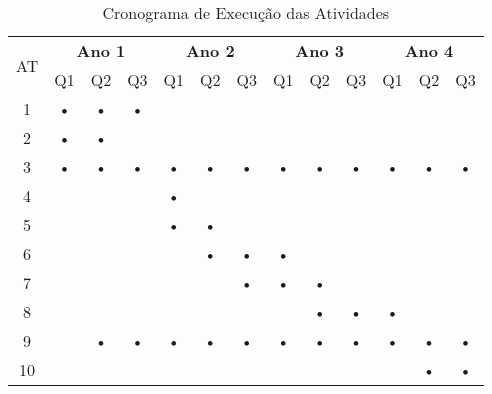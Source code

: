 \documentclass[12pt]{article}
\begin{document}
\begin{table}[htbp]
	\centering
		\begin{tabular}{|c|c|c|c|c|c|c|c|c|c|c|c|c|}
			\hline
			\multirow{2}{*}{AT} & \multicolumn{3}{c|}{\textbf{Ano 1}} & \multicolumn{3}{c|}{\textbf{Ano 2}} & \multicolumn{3}{c|}{\textbf{Ano 3}} & \multicolumn{3}{c|}{\textbf{Ano 4}} \\ \cline{2-13} 
													& Q1         & Q2         & Q3        & Q1         & Q2         & Q3        & Q1         & Q2         & Q3        & Q1         & Q2         & Q3        \\ \hline
			1                   & •          & •          & •         &            &            &           &            &            &           &            &            &           \\ \hline
			2                   & •          & •          &           &            &            &           &            &            &           &            &            &           \\ \hline
			3                   & •          & •          & •         & •          & •          & •         & •          & •          & •         & •          & •          & •         \\ \hline
			4                   &            &            &           & •          &            &           &            &            &           &            &            &           \\ \hline
			5                   &            &            &           & •          & •          &           &            &            &           &            &            &           \\ \hline
			6                   &            &            &           &            & •          & •         & •          &            &           &            &            &           \\ \hline
			7                   &            &            &           &            &            & •         & •          & •          &           &            &            &           \\ \hline
			8                   &            &            &           &            &            &           &            & •          & •         & •          &            &           \\ \hline
			9                   &            & •          & •         & •          & •          & •         & •          & •          & •         & •          & •          & •         \\ \hline
			10                  &            &            &           &            &            &           &            &            &           &            & •          & •         \\ \hline
		\end{tabular}
	\caption{Cronograma de Execução das Atividades}
	\label{tab:cronograma}
\end{table}



\end{document}
